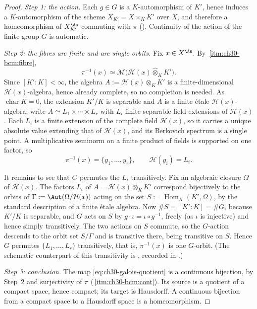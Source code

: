 \begin{proof}
\emph{Step 1: the action.}  Each \(g\in G\) is a \(K\)-automorphism of
\(K'\), hence induces a \(K\)-automorphism of the scheme
\(X_{K'}=X\times_KK'\) over \(X\), and therefore a homeomorphism of
\(X_{K'}^{\An}\) commuting with \(\pi\)
().  Continuity of the action of the finite
group \(G\) is automatic.

\emph{Step 2: the fibres are finite and are single orbits.}  Fix
\(x\in X^{\An}\).  By
\,\cref{itm:ch30-bcm:fibre},
\[
 \pi^{-1}(x)\simeq
 \mathcal M\bigl(\mathcal H(x)\widehat\otimes_KK'\bigr).
\]
Since \([K':K]<\infty\), the algebra \(A:=\mathcal H(x)\otimes_KK'\) is a
finite-dimensional \(\mathcal H(x)\)-algebra, hence already complete, so no
completion is needed.  As \(\operatorname{char}K=0\), the extension
\(K'/K\) is separable and \(A\) is a finite étale
\(\mathcal H(x)\)-algebra; write
\(A\simeq L_1\times\cdots\times L_r\) with \(L_i\) finite separable field
extensions of \(\mathcal H(x)\).  Each \(L_i\) is a finite extension of the
complete field \(\mathcal H(x)\), so it carries a unique absolute value
extending that of \(\mathcal H(x)\), and its Berkovich spectrum is a single
point.  A multiplicative seminorm on a finite product of fields is supported
on one factor, so
\[
 \pi^{-1}(x)=\{y_1,\ldots,y_r\},
 \qquad \mathcal H(y_i)=L_i .
\]

It remains to see that \(G\) permutes the \(L_i\) transitively.  Fix an
algebraic closure \(\Omega\) of \(\mathcal H(x)\).  The factors \(L_i\) of
\(A=\mathcal H(x)\otimes_KK'\) correspond bijectively to the orbits of
\(\Gamma:=\Aut(\Omega/\mathcal H(x))\) acting on the set
\(S:=\operatorname{Hom}_K(K',\Omega)\), by the standard description of a
finite étale algebra.  Now \(\#S=[K':K]=\#G\), because \(K'/K\) is
separable, and \(G\) acts on \(S\) by \(g\cdot\iota=\iota\circ g^{-1}\),
freely (as \(\iota\) is injective) and hence simply transitively.  The two
actions on \(S\) commute, so the \(G\)-action descends to the orbit set
\(S/\Gamma\) and is transitive there, being transitive on \(S\).  Hence
\(G\) permutes \(\{L_1,\ldots,L_r\}\) transitively, that is,
\(\pi^{-1}(x)\) is one \(G\)-orbit.  (The schematic counterpart of this
transitivity is \cite[Tag 0BRI]{stacks-project}, recorded in
.)

\emph{Step 3: conclusion.}  The map \eqref{eq:ch30-galois-quotient} is a
continuous bijection, by Step~2 and surjectivity of \(\pi\)
(\,\cref{itm:ch30-bcm:cont}).  Its source is a
quotient of a compact space, hence compact; its target is Hausdorff.  A
continuous bijection from a compact space to a Hausdorff space is a
homeomorphism.
\end{proof}

